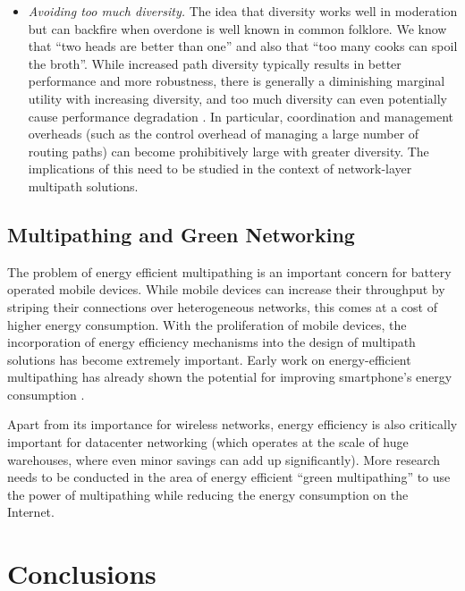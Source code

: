 \documentclass[10pt]{IEEEtran}
\begin{document}
\begin{itemize}
\vspace{1mm}
\item \textit{Avoiding too much diversity.} The idea that diversity works well in moderation but can backfire when overdone is well known in common folklore. We know that ``two heads are better than one'' and also that ``too many cooks can spoil the broth''. While increased path diversity typically results in better performance and more robustness, there is generally a diminishing marginal utility with increasing diversity, and too much diversity can even potentially cause performance degradation \cite{page2010diversity}. In particular, coordination and management overheads (such as the control overhead of managing a large number of routing paths) can become prohibitively large with greater diversity. The implications of this need to be studied in the context of network-layer multipath solutions. 

\end{itemize}

\subsection{Multipathing and Green Networking}

The problem of energy efficient multipathing is an important concern for battery operated mobile devices. While mobile devices can increase their throughput by striping their connections over heterogeneous networks, this comes at a cost of higher energy consumption. With the proliferation of mobile devices, the incorporation of energy efficiency mechanisms into the design of multipath solutions has become extremely important. Early work on energy-efficient multipathing has already shown the potential for improving smartphone's energy consumption \cite{pluntke2011saving,raiciu2011opportunistic,paasch2012exploring,lim2014green}. 

Apart from its importance for wireless networks, energy efficiency is also critically important for datacenter networking (which operates at the scale of huge warehouses, where even minor savings can add up significantly). More research needs to be conducted in the area of energy efficient ``green multipathing'' to use the power of multipathing while reducing the energy consumption on the Internet. 

\section{Conclusions}
\label{sec:con}
\end{document}
